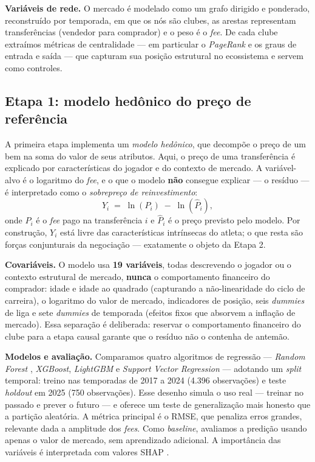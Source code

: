 \documentclass[12pt]{article}
\begin{document}
\textbf{Variáveis de rede.} O mercado é modelado como um grafo dirigido e ponderado, reconstruído
por temporada, em que os nós são clubes, as arestas representam transferências (vendedor para
comprador) e o peso é o \textit{fee}. De cada clube extraímos métricas de centralidade — em
particular o \textit{PageRank} e os graus de entrada e saída — que capturam sua posição estrutural
no ecossistema e servem como controles.

\subsection{Etapa 1: modelo hedônico do preço de referência}

A primeira etapa implementa um \textit{modelo hedônico}, que decompõe o preço de um bem na soma do
valor de seus atributos. Aqui, o preço de uma transferência é explicado por características do
jogador e do contexto de mercado. A variável-alvo é o logaritmo do \textit{fee}, e o que o modelo
\textbf{não} consegue explicar — o resíduo — é interpretado como o \textit{sobrepreço de
reinvestimento}:
%
\begin{equation}
Y_{i} \;=\; \ln(P_i) \;-\; \ln(\hat{P}_i),
\label{eq:residuo}
\end{equation}
%
onde $P_i$ é o \textit{fee} pago na transferência $i$ e $\hat{P}_i$ é o preço previsto pelo modelo.
Por construção, $Y_i$ está livre das características intrínsecas do atleta; o que resta são forças
conjunturais da negociação — exatamente o objeto da Etapa 2.

\textbf{Covariáveis.} O modelo usa \textbf{19 variáveis}, todas descrevendo o jogador ou o contexto
estrutural de mercado, \textbf{nunca} o comportamento financeiro do comprador: idade e idade ao
quadrado (capturando a não-linearidade do ciclo de carreira), o logaritmo do valor de mercado,
indicadores de posição, seis \textit{dummies} de liga e sete \textit{dummies} de temporada (efeitos
fixos que absorvem a inflação de mercado). Essa separação é deliberada: reservar o comportamento
financeiro do clube para a etapa causal garante que o resíduo não o contenha de antemão.

\textbf{Modelos e avaliação.} Comparamos quatro algoritmos de regressão — \textit{Random Forest}
\cite{breiman2001}, \textit{XGBoost}, \textit{LightGBM} e \textit{Support Vector Regression} —
adotando um \textit{split} temporal: treino nas temporadas de 2017 a 2024 (4.396 observações) e
teste \textit{holdout} em 2025 (750 observações). Esse desenho simula o uso real — treinar no
passado e prever o futuro — e oferece um teste de generalização mais honesto que a partição
aleatória. A métrica principal é o RMSE, que penaliza erros grandes, relevante dada a amplitude dos
\textit{fees}. Como \textit{baseline}, avaliamos a predição usando apenas o valor de mercado, sem
aprendizado adicional. A importância das variáveis é interpretada com valores SHAP
\cite{lundberg2017}.
\end{document}
